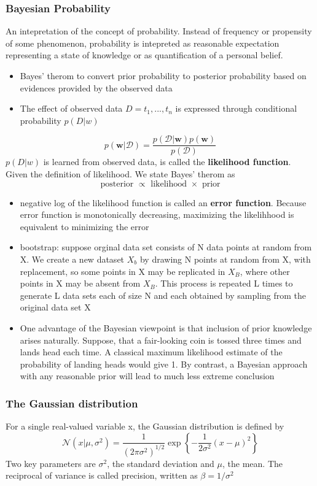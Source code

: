 \documentclass[11pt]{article}
\begin{document}
\subsubsection{Bayesian Probability}
\label{sec:org0cff023}
An intepretation of the concept of probability. Instead of frequency or propensity of some phenomenon, probability is intepreted as reasonable expectation representing a state of knowledge or as quantification of a personal belief.     
\begin{itemize}
\item Bayes' therom to convert prior probability to posterior probability based on evidences provided by the observed data
\item The effect of observed data \(D = {t_1,..., t_n}\) is expressed through conditional probability \(p(D|w)\)
\end{itemize}
$$
p ( \mathbf { w } | \mathcal { D } ) = \frac { p ( \mathcal { D } | \mathbf { w } ) p ( \mathbf { w } ) } { p ( \mathcal { D } ) }
$$
\(p(D|w)\) is learned from observed data, is called the \textbf{\textbf{likelihood function}}.
Given the definition of likelihood. We state Bayes' therom as 
$$
\text { posterior } \propto \text { likelihood } \times \text { prior }
$$
\begin{itemize}
\item negative log of the likelihood function is called an \textbf{\textbf{error function}}. Because error function is monotonically decreasing, maximizing the likelihhood is equivalent to minimizing the error
\item bootstrap: suppose orginal data set consists of N data points at random from X. We create a new dataset \(X_b\) by drawing N points at random from X, with replacement, so some points in X may be replicated in \(X_B\), where other points in X may be absent from \(X_B\). This process is repeated L times to generate L data sets each of size N and each obtained by sampling from the original data set X
\item One advantage of the Bayesian viewpoint is that inclusion of prior knowledge arises naturally. Suppose, that a fair-looking coin is tossed three times and lands head each time. A classical maximum likelihood estimate of the probability of landing heads would give 1. By contrast, a Bayesian approach with any reasonable prior will lead to much less extreme conclusion
\end{itemize}
\subsubsection{The Gaussian distribution}
\label{sec:org3a4b739}
For a single real-valued variable x, the Gaussian distribution is defined by 
$$
\mathcal { N } \left( x | \mu , \sigma ^ { 2 } \right) = \frac { 1 } { \left( 2 \pi \sigma ^ { 2 } \right) ^ { 1 / 2 } } \exp \left\{ - \frac { 1 } { 2 \sigma ^ { 2 } } ( x - \mu ) ^ { 2 } \right\}
$$
Two key parameters are \(\sigma^2\), the standard deviation and \(\mu\), the mean. The reciprocal of variance is called precision, written as \(\beta = 1 / \sigma ^ { 2 }\) 
\end{document}
